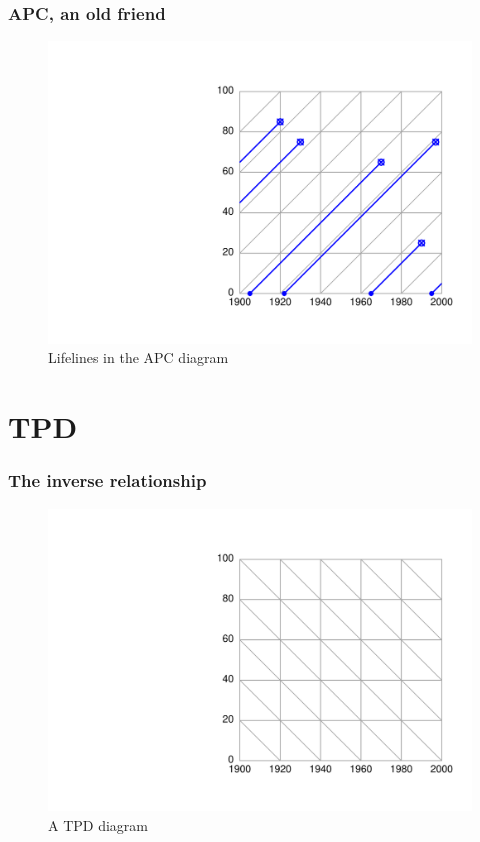 \documentclass[20pt]{beamer}
\begin{document}
\begin{frame}
\frametitle{APC, an old friend}
\begin{figure}[b]
    \centering
    \includegraphics[scale=.9]{Figures/LabPres/APC2.pdf}
    \caption{Lifelines in the APC diagram}
\end{figure} 
\end{frame}


\section{TPD}
\begin{frame}
\frametitle{The inverse relationship}
\begin{figure}[b]
    \centering
    \includegraphics[scale=.9]{Figures/LabPres/TPD1.pdf}
    \caption{A TPD diagram}
\end{figure} 
\end{frame}
\end{document}
